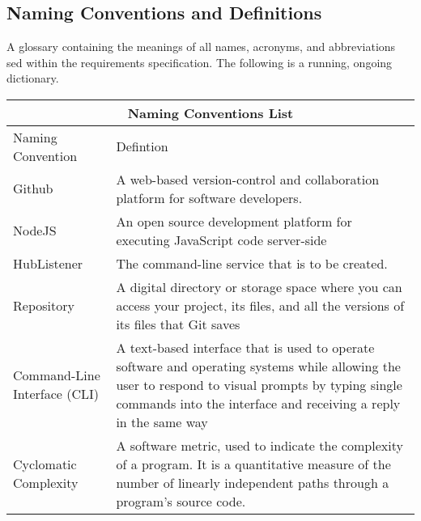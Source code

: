 \documentclass{article}
\begin{document}
\subsection{Naming Conventions and Definitions}

A glossary containing the meanings of all names, acronyms, and abbreviations sed within the requirements specification. The following is a running, ongoing dictionary. 
\newline
\begin{tabular}{ |p{6cm}||p{6cm}|  }
 \hline
 \multicolumn{2}{|c|}{Naming Conventions List} \\
 \hline
 Naming        Convention & Defintion\\
 \hline 
Github & A web-based version-control and collaboration platform for software developers. \\
\hline
NodeJS &  An open source development platform for executing JavaScript code server-side \\
\hline
HubListener & The command-line service that is to be created.\\
\hline
Repository & A digital directory or storage space where you can access your project, its files, and all the versions of its files that Git saves\\
\hline
Command-Line Interface (CLI) & A text-based interface that is used to operate software and operating systems while allowing the user to respond to visual prompts by typing single commands into the interface and receiving a reply in the same way\\
\hline
Cyclomatic Complexity &A software metric, used to indicate the complexity of a program. It is a quantitative measure of the number of linearly independent paths through a program's source code.\\
\hline 
\end{tabular}
\end{document}
